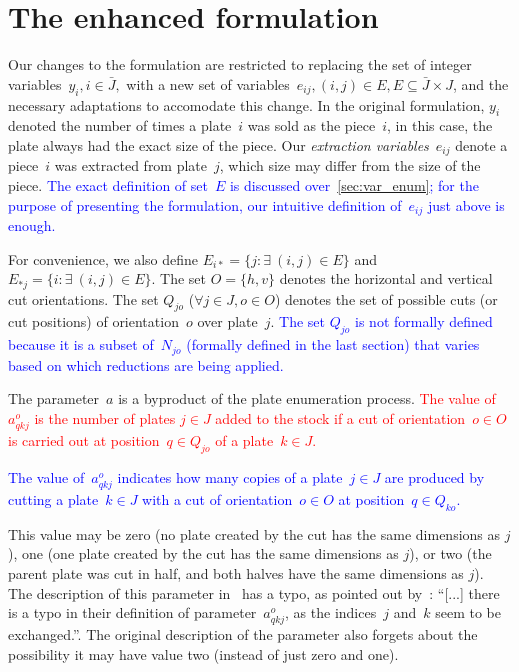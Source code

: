 \documentclass[ppgc,tese,english,formais,babel]{iiufrgs}
\newif\iffinalversion
\newcommand{\newtext}[1]{\iffinalversion%
#1%
\else%
\textcolor{blue}{#1}%
\fi%
}
\newcommand{\oldtext}[1]{\iffinalversion%
\else%
\textcolor{red}{#1}%
\fi%
}
\begin{document}
\section{The enhanced formulation}
\label{sec:enhanced}

Our changes to the formulation are restricted to replacing the set of integer variables~\(y_i, i \in \bar{J},\) with a new set of variables~\(e_{ij}, (i, j) \in E, E \subseteq \bar{J} \times J\), and the necessary adaptations to accomodate this change.
In the original formulation, \(y_i\) denoted the number of times a plate~\(i\) was sold as the piece~\(i\), in this case, the plate always had the exact size of the piece.
Our \emph{extraction variables}~\(e_{ij}\) denote a piece~\(i\) was extracted from plate~\(j\), which size may differ from the size of the piece.
\newtext{The exact definition of set~\(E\) is discussed over~\cref{sec:var_enum}; for the purpose of presenting the formulation, our intuitive definition of~\(e_{ij}\) just above is enough.}
For convenience, we also define \(E_{i*} = \{ j : \exists~(i, j) \in E \}\) and \(E_{*j} = \{i : \exists~(i, j) \in E \}\).
The set \(O = \{h, v\}\) denotes the horizontal and vertical cut orientations.
The set \(Q_{jo}\) (\(\forall j \in J, o \in O\)) denotes the set of possible cuts (or cut positions) of orientation~\(o\) over plate~\(j\).
\newtext{The set \(Q_{jo}\) is not formally defined because it is a subset of~\(N_{jo}\) (formally defined in the last section) that varies based on which reductions are being applied.}

The parameter~\(a\) is a byproduct of the plate enumeration process.
\oldtext{The value of \(a^o_{qkj}\) is the number of plates \(j \in J\) added to the stock if a cut of orientation~\(o \in O\) is carried out at position~\(q \in Q_{jo}\) of a plate~\(k \in J\).}
\newtext{The value of~\(a^o_{qkj}\) indicates how many copies of a plate~\(j \in J\) are produced by cutting a plate~\(k \in J\) with a cut of orientation~\(o \in O\) at position~\(q \in Q_{ko}\).}
This value may be zero (no plate created by the cut has the same dimensions as \(j\)), one (one plate created by the cut has the same dimensions as \(j\)), or two (the parent plate was cut in half, and both halves have the same dimensions as \(j\)).
The description of this parameter in~\citet{furini:2016} has a typo, as pointed out by~\citet{martin:2020}:
``[...] there is a typo in their definition of parameter~\(a^o_{qkj}\), as the indices~\(j\) and~\(k\) seem to be exchanged.''.
The original description of the parameter also forgets about the possibility it may have value two (instead of just zero and one).
\end{document}
